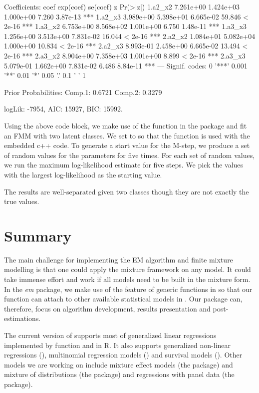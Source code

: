 \documentclass[nojss]{jss}
\begin{document}
\begin{Schunk}
\begin{Soutput}
Coefficients: 
             coef exp(coef)  se(coef)      z Pr(>|z|)    
1.a2_x2 7.261e+00 1.424e+03 1.000e+00  7.260 3.87e-13 ***
1.a2_x3 3.989e+00 5.398e+01 6.665e-02 59.846  < 2e-16 ***
1.a3_x2 6.753e+00 8.568e+02 1.001e+00  6.750 1.48e-11 ***
1.a3_x3 1.256e+00 3.513e+00 7.831e-02 16.044  < 2e-16 ***
2.a2_x2 1.084e+01 5.082e+04 1.000e+00 10.834  < 2e-16 ***
2.a2_x3 8.993e-01 2.458e+00 6.665e-02 13.494  < 2e-16 ***
2.a3_x2 8.904e+00 7.358e+03 1.001e+00  8.899  < 2e-16 ***
2.a3_x3 5.079e-01 1.662e+00 7.831e-02  6.486 8.84e-11 ***
---
Signif. codes:  0 '***' 0.001 '**' 0.01 '*' 0.05 '.' 0.1 ' ' 1

Prior Probabilities: 
Comp.1: 0.6721
Comp.2: 0.3279


logLik: -7954, AIC: 15927, BIC: 15992. 
\end{Soutput}
\end{Schunk}

Using the above code block, we make use of the function  in the  package and fit an FMM with two latent classes. We set  to  so that the  function is used with the embedded c++ code. To generate a start value for the M-step, we produce a set of random values for the parameters for five times. For each set of random values, we run the maximum log-likelihood estimate for five steps. We pick the values with the largest log-likelihood as the starting value.

The results are well-separated given two classes though they are not exactly the true values. 
   \section{Summary}
   The main challenge for implementing the EM algorithm and finite mixture modelling is that one could apply the mixture framework on any model. It could take immense effort and work if all models need to be built in the mixture form. In the \emph{em} package, we make use of the feature of generic functions in  so that our  function can attach to other available statistical models in . Our package can, therefore, focus on algorithm development, results presentation and post-estimations.
   
   The current version of  supports most of generalized linear regressions implemented by function  and  in R. It also supports generalized non-linear regressions (), multinomial regression models () and survival models (). Other models we are working on include mixture effect models (the  package) and mixture of distributions (the  package) and regressions with panel data (the  package).
   
\end{document}
